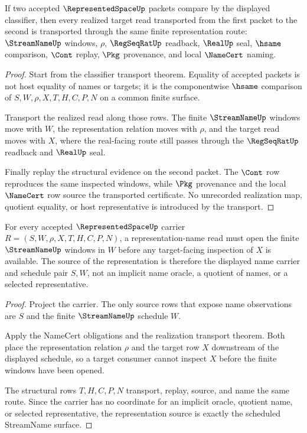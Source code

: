 \begin{theorem}
\label{thm:representedspace-realization-transport}
If two accepted $\RepresentedSpaceUp$ packets compare by the displayed classifier, then every realized target read transported from the first packet to the second is transported through the same finite representation route: $\StreamNameUp$ windows, $\rho$, $\RegSeqRatUp$ readback, $\RealUp$ seal, $\hsame$ comparison, $\Cont$ replay, $\Pkg$ provenance, and local $\NameCert$ naming.
\end{theorem}
\begin{proof}
Start from the classifier transport theorem. Equality of accepted packets is not host equality of names or targets; it is the componentwise $\hsame$ comparison of $S,W,\rho,X,T,H,C,P,N$ on a common finite surface.

Transport the realized read along those rows. The finite $\StreamNameUp$ windows move with $W$, the representation relation moves with $\rho$, and the target read moves with $X$, where the real-facing route still passes through the $\RegSeqRatUp$ readback and $\RealUp$ seal.

Finally replay the structural evidence on the second packet. The $\Cont$ row reproduces the same inspected windows, while $\Pkg$ provenance and the local $\NameCert$ row source the transported certificate. No unrecorded realization map, quotient equality, or host representative is introduced by the transport.
\end{proof}

\begin{theorem}
\label{thm:representedspace-streamname-representation-source}
For every accepted $\RepresentedSpaceUp$ carrier $R=(S,W,\rho,X,T,H,C,P,N)$, a representation-name read must open the finite $\StreamNameUp$ windows in $W$ before any target-facing inspection of $X$ is available. The source of the representation is therefore the displayed name carrier and schedule pair $S,W$, not an implicit name oracle, a quotient of names, or a selected representative.
\end{theorem}
\begin{proof}
Project the carrier. The only source rows that expose name observations are $S$ and the finite $\StreamNameUp$ schedule $W$.

Apply the NameCert obligations and the realization transport theorem. Both place the representation relation $\rho$ and the target row $X$ downstream of the displayed schedule, so a target consumer cannot inspect $X$ before the finite windows have been opened.

The structural rows $T,H,C,P,N$ transport, replay, source, and name the same route. Since the carrier has no coordinate for an implicit oracle, quotient name, or selected representative, the representation source is exactly the scheduled StreamName surface.
\end{proof}

